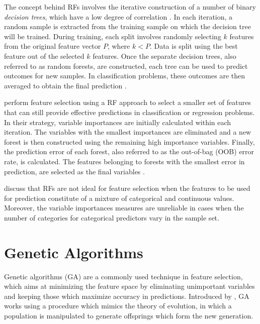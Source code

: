 The concept behind RFs involves the iterative construction of a number of binary \textit{decision trees}, which have a low degree of correlation \citep{Genuer2010}. In each iteration, a random sample is extracted from the training sample on which the decision tree will be trained. During training, each split involves randomly selecting $k$ features from the original feature vector $P$, where $k < P$. Data is split using the best feature out of the selected $k$ features. Once the separate decision trees, also referred to as random forests, are constructed, each tree can be used to predict outcomes for new samples. In classification problems, these outcomes are then averaged to obtain the final prediction \citep{kuhn2013applied}. 

\citet{Diaz-Uriarte2006} perform feature selection using a RF approach to select a smaller set of features that can still provide effective predictions in classification or regression problems. In their strategy, variable importances are initially calculated within each iteration. The variables with the smallest importances are eliminated and a new forest is then constructed using the remaining high importance variables. Finally, the prediction error of each forest, also referred to as the out-of-bag (OOB) error rate, is calculated. The features belonging to forests with the smallest error in prediction, are selected as the final variables \citep{Diaz-Uriarte2006}.

\citet{Strobl2007} discuss that RFs are not ideal for feature selection when the features to be used for prediction constitute of a mixture of categorical and continuous values. Moreover, the variable importances measures are unreliable in cases when the number of categories for categorical predictors vary in the sample set.

\section{Genetic Algorithms}

Genetic algorithms (GA) are a commonly used technique in feature selection, which aims at minimizing the feature space by eliminating unimportant variables and keeping those which maximize accuracy in predictions. Introduced by \citet{Holland1962}, GA works using a procedure which mimics the theory of evolution, in which a population is manipulated to generate offsprings which form the new generation. 

